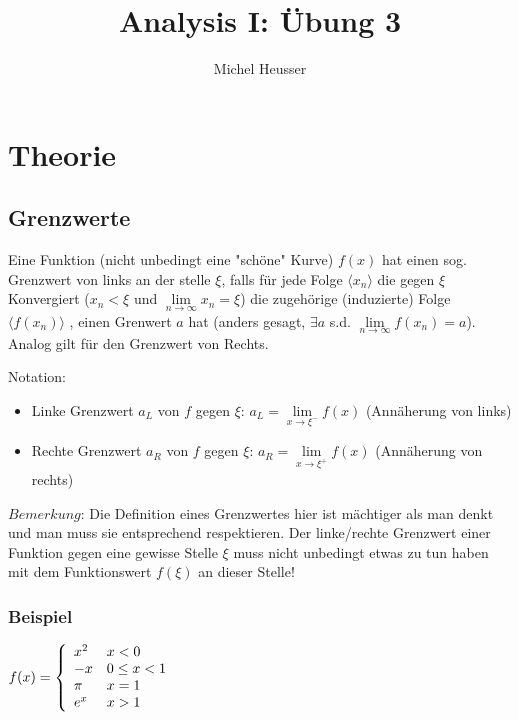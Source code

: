\documentclass[11pt]{article} %
\title{Analysis I: Übung 3}
\author{Michel Heusser}
\begin{document}
\maketitle

\section{Theorie}
\subsection{Grenzwerte}

Eine Funktion (nicht unbedingt eine "schöne" Kurve) $f(x)$ hat einen sog. Grenzwert von links an der stelle $\xi$, falls für jede Folge $\langle x_n \rangle$ die gegen $\xi$ Konvergiert ($x_n<\xi$ und $\lim\limits_{n\rightarrow \infty} x_n = \xi$) die zugehörige (induzierte) Folge $\langle f(x_n) \rangle$ , einen Grenwert $a$ hat (anders gesagt, $\exists a$ s.d. $\lim\limits_{n\rightarrow \infty} f(x_n) = a$). Analog gilt für den Grenzwert von Rechts.

Notation:
\begin{itemize}
\item Linke Grenzwert $a_L$ von $f$ gegen $\xi$: $a_L = \lim\limits_{x\rightarrow \xi^-} f(x)$ (Annäherung von links)
\item Rechte Grenzwert $a_R$ von $f$ gegen $\xi$: $a_R = \lim\limits_{x\rightarrow \xi^+} f(x)$ (Annäherung von rechts)
\end{itemize}

$Bemerkung$: Die Definition eines Grenzwertes hier ist mächtiger als man denkt und man muss sie entsprechend respektieren. Der linke/rechte Grenzwert einer Funktion gegen eine gewisse Stelle $\xi$ muss nicht unbedingt etwas zu tun haben mit dem Funktionswert $f(\xi)$ an dieser Stelle! \\



\subsubsection{Beispiel}

$f(x) = \left \{ 
\begin{array}{l  l}
	x^2 & x<0\\
	-x & 0\leq x < 1\\
	\pi & x=1\\
	e^x & x>1 \\
\end{array} \right.$ 
\end{document}

